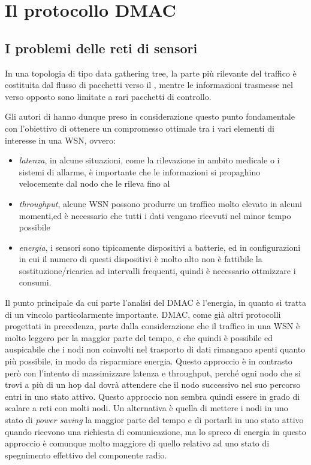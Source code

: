 \documentclass[twoside,11pt,a4paper,italian,openany]{book}
\begin{document}
\chapter{Il protocollo DMAC}
\section{I problemi delle reti di sensori}
In una topologia di tipo data gathering tree, la parte più rilevante del 
traffico è costituita dal flusso di pacchetti verso il \sink, mentre le informazioni 
trasmesse nel verso opposto sono limitate a rari pacchetti di controllo.

Gli autori di \cite{DMAC} hanno dunque preso in considerazione questo punto fondamentale con l'obiettivo di ottenere un compromesso ottimale tra i vari elementi di interesse in una WSN, ovvero:

\begin{itemize}

\item \emph{latenza}, in alcune situazioni, come la rilevazione in ambito medicale o 
i sistemi di allarme, è importante che le informazioni si propaghino velocemente dal nodo che le 
rileva fino al \sink

\item \emph{throughput}, alcune WSN possono produrre un traffico molto elevato in alcuni momenti,ed è necessario che tutti i dati vengano ricevuti nel minor tempo possibile 

\item \emph{energia}, i sensori sono tipicamente dispositivi a batterie, ed in configurazioni
in cui il numero di questi dispositivi è molto alto non è fattibile la sostituzione/ricarica ad 
intervalli frequenti, quindi è necessario ottmizzare i consumi.

\end{itemize}

Il punto principale da cui parte l'analisi del DMAC è l'energia, in quanto si tratta di un 
vincolo particolarmente importante. DMAC, come già altri protocolli\cite{SMAC}\cite{TMAC} 
progettati in precedenza, parte dalla considerazione che il traffico in una WSN è molto leggero 
per la maggior parte del tempo, e che quindi è 
possibile ed auspicabile che i nodi non coinvolti nel trasporto di dati rimangano spenti 
quanto più possibile, in modo da risparmiare energia. 
Questo approccio è in contrasto però con l'intento di massimizzare latenza e throughput, 
perché ogni nodo che si trovi a più di un hop dal \sink dovrà attendere che il nodo successivo 
nel suo percorso entri in uno stato attivo. Questo approccio non sembra quindi essere in grado 
di scalare a reti con molti nodi. 
Un alternativa è quella di mettere i nodi in uno stato di \emph{power saving} la 
maggior parte del tempo e di portarli in uno stato attivo quando ricevono una richiesta di 
comunicazione, ma lo spreco di energia in questo approccio è comunque molto maggiore di quello 
relativo ad uno stato di spegnimento effettivo del componente radio. 
\end{document}
